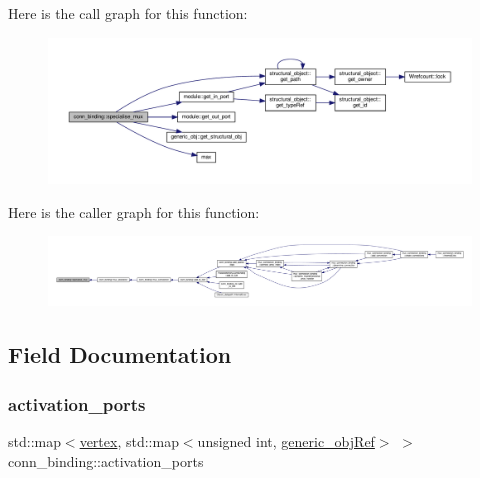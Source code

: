 Here is the call graph for this function\+:
\nopagebreak
\begin{figure}[H]
\begin{center}
\leavevmode
\includegraphics[width=350pt]{d2/db1/classconn__binding_ae9a6eb2b8e5eb480e94a8a1f04ce58e4_cgraph}
\end{center}
\end{figure}
Here is the caller graph for this function\+:
\nopagebreak
\begin{figure}[H]
\begin{center}
\leavevmode
\includegraphics[width=350pt]{d2/db1/classconn__binding_ae9a6eb2b8e5eb480e94a8a1f04ce58e4_icgraph}
\end{center}
\end{figure}


\subsection{Field Documentation}
\mbox{\label{classconn__binding_ac0b9f48b56e603ba299ae97f439247a7}} 
\subsubsection{\texorpdfstring{activation\+\_\+ports}{activation\_ports}}
{\footnotesize\ttfamily std\+::map$<$\hyperlink{graph_8hpp_abefdcf0544e601805af44eca032cca14}{vertex}, std\+::map$<$unsigned int, \hyperlink{generic__obj_8hpp_acb533b2ef8e0fe72e09a04d20904ca81}{generic\+\_\+obj\+Ref}$>$ $>$ conn\+\_\+binding\+::activation\+\_\+ports\hspace{0.3cm}{\ttfamily [protected]}}



